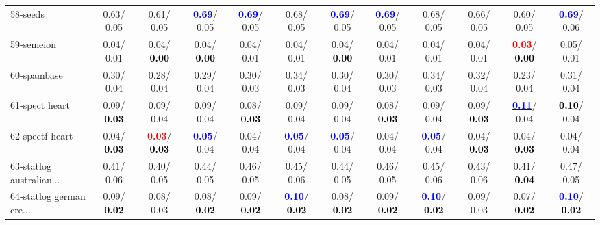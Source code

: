\begin{table}[h]
\begin{center}
{\begin{tabular}{lc|c|c|c|c|c|c|c|c|c|c}
58-seeds &   0.63/  0.05 &   0.61/  0.05 & \textcolor{blue}{\textbf{  0.69}}/  0.05 & \textcolor{blue}{\textbf{  0.69}}/  0.05 &   0.68/  0.05 & \textcolor{blue}{\textbf{  0.69}}/  0.05 & \textcolor{blue}{\textbf{  0.69}}/  0.05 &   0.68/  0.05 &   0.66/  0.05 &   0.60/  0.05 & \textcolor{blue}{\textbf{  0.69}}/  0.06 \\
59-semeion &   0.04/  0.01 &   0.04/\textcolor{black}{\textbf{  0.00}} &   0.04/\textcolor{black}{\textbf{  0.00}} &   0.04/  0.01 &   0.04/  0.01 &   0.04/\textcolor{black}{\textbf{  0.00}} &   0.04/  0.01 &   0.04/  0.01 &   0.04/  0.01 & \textcolor{red}{\textbf{  0.03}}/\textcolor{black}{\textbf{  0.00}} &   0.05/  0.01 \\
60-spambase &   0.30/  0.04 &   0.28/  0.04 &   0.29/  0.04 &   0.30/  0.03 &   0.34/  0.03 &   0.30/  0.04 &   0.30/  0.03 &   0.34/  0.03 &   0.32/  0.04 &   0.23/  0.04 &   0.31/  0.04 \\ \hline
61-spect heart &   0.09/\textcolor{black}{\textbf{  0.03}} &   0.09/  0.04 &   0.09/  0.04 &   0.08/\textcolor{black}{\textbf{  0.03}} &   0.09/  0.04 &   0.09/  0.04 &   0.08/\textcolor{black}{\textbf{  0.03}} &   0.09/  0.04 &   0.09/\textcolor{black}{\textbf{  0.03}} & \underline{\textcolor{blue}{\textbf{  0.11}}}/  0.04 & \textcolor{black}{\textbf{  0.10}}/  0.04 \\
62-spectf heart &   0.04/\textcolor{black}{\textbf{  0.03}} & \textcolor{red}{\textbf{  0.03}}/\textcolor{black}{\textbf{  0.03}} & \textcolor{blue}{\textbf{  0.05}}/  0.04 &   0.04/  0.04 & \textcolor{blue}{\textbf{  0.05}}/  0.04 & \textcolor{blue}{\textbf{  0.05}}/  0.04 &   0.04/  0.04 & \textcolor{blue}{\textbf{  0.05}}/  0.04 &   0.04/\textcolor{black}{\textbf{  0.03}} &   0.04/\textcolor{black}{\textbf{  0.03}} &   0.04/  0.04 \\
63-statlog australian... &   0.41/  0.06 &   0.40/  0.05 &   0.44/  0.05 &   0.46/  0.05 &   0.45/  0.06 &   0.44/  0.05 &   0.46/  0.05 &   0.45/  0.06 &   0.43/  0.06 &   0.41/\textcolor{black}{\textbf{  0.04}} &   0.47/  0.05 \\
64-statlog german cre... &   0.09/\textcolor{black}{\textbf{  0.02}} &   0.08/  0.03 &   0.08/\textcolor{black}{\textbf{  0.02}} &   0.09/\textcolor{black}{\textbf{  0.02}} & \textcolor{blue}{\textbf{  0.10}}/\textcolor{black}{\textbf{  0.02}} &   0.08/\textcolor{black}{\textbf{  0.02}} &   0.09/\textcolor{black}{\textbf{  0.02}} & \textcolor{blue}{\textbf{  0.10}}/\textcolor{black}{\textbf{  0.02}} &   0.09/  0.03 &   0.07/\textcolor{black}{\textbf{  0.02}} & \textcolor{blue}{\textbf{  0.10}}/\textcolor{black}{\textbf{  0.02}} \\\end{tabular}
}\label{strats1aCIELM}
\end{center}
\end{table}
